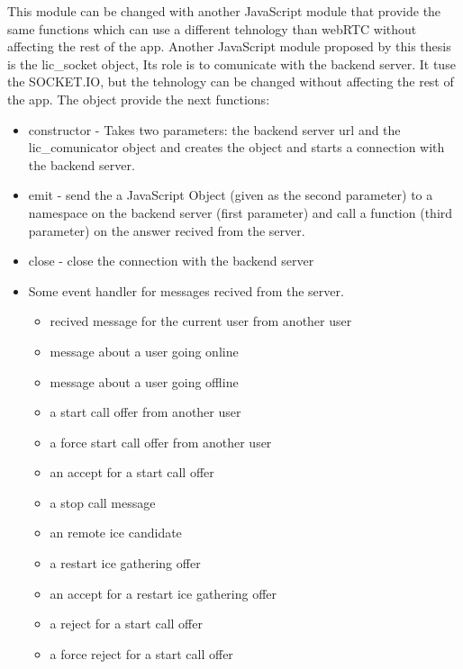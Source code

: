 This module can be changed with another JavaScript module that provide the same functions which can use 
a different tehnology than webRTC without affecting the rest of the app.
Another JavaScript module proposed by this thesis is the lic_socket object, Its role is
to comunicate with the backend server. It tuse the SOCKET.IO, but the
tehnology can be changed without affecting the rest of the app. The object provide the next functions:
\begin{itemize}
    \item constructor - Takes two parameters: the backend server url and the lic_comunicator object and creates the object and starts a connection with the backend server.
    \item emit - send the a JavaScript Object (given as the second parameter) to a namespace on the backend server (first parameter) and call a function (third parameter) on
    the answer recived from the server.
    \item close - close the connection with the backend server
    \item Some event handler for messages recived from the server.
        \begin{itemize}
            \item recived message for the current user from another user
            \item message about a user going online
            \item message about a user going offline
            \item a start call offer from another user
            \item a force start call offer from another user
            \item an accept for a start call offer
            \item a stop call message
            \item an remote ice candidate
            \item a restart ice gathering offer
            \item an accept for a restart ice gathering offer
            \item a reject for a start call offer
            \item a force reject for a start call offer
        \end{itemize}
\end{itemize}

